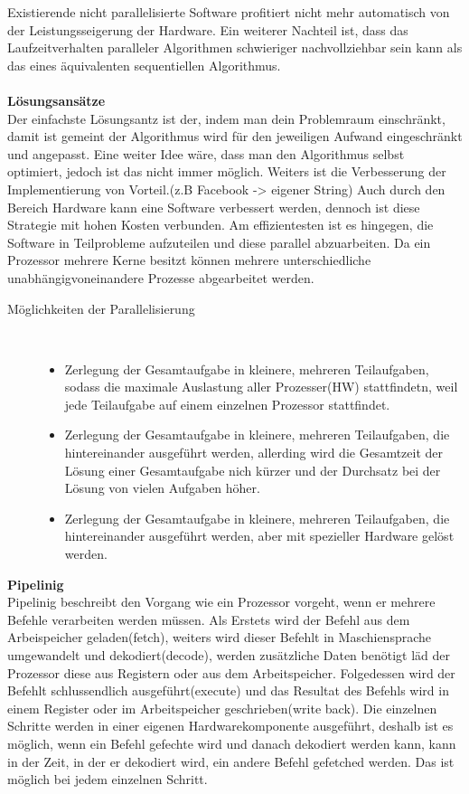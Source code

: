 \documentclass[a4paper,12pt]{article}
\begin{document}
Existierende nicht parallelisierte Software profitiert nicht mehr automatisch von der Leistungsseigerung der Hardware. Ein weiterer Nachteil ist, dass das Laufzeitverhalten paralleler Algorithmen schwieriger nachvollziehbar sein kann als das eines äquivalenten sequentiellen Algorithmus.\\\\
\textbf{Lösungsansätze\\}
Der einfachste Lösungsantz ist der, indem man dein Problemraum einschränkt, damit ist gemeint der Algorithmus wird für den jeweiligen Aufwand eingeschränkt und angepasst. Eine weiter Idee wäre, dass man den Algorithmus selbst optimiert, jedoch ist das nicht immer möglich. Weiters ist die Verbesserung der Implementierung von Vorteil.(z.B Facebook -> eigener String)
Auch durch den Bereich Hardware kann eine Software verbessert werden, dennoch ist diese Strategie mit hohen Kosten verbunden. Am effizientesten ist es hingegen, die Software in Teilprobleme aufzuteilen und diese parallel abzuarbeiten. Da ein Prozessor mehrere Kerne besitzt können mehrere unterschiedliche unabhängigvoneinandere Prozesse abgearbeitet werden. 
\begin{description}
    \item[Möglichkeiten der Parallelisierung] ~\par
    \begin{itemize}
        \item Zerlegung der Gesamtaufgabe in kleinere, mehreren Teilaufgaben, sodass die maximale Auslastung aller Prozesser(HW) stattfindetn, weil jede Teilaufgabe auf einem einzelnen Prozessor stattfindet.
        \item Zerlegung der Gesamtaufgabe in kleinere, mehreren Teilaufgaben, die hintereinander ausgeführt werden, allerding wird die Gesamtzeit der Lösung einer Gesamtaufgabe nich kürzer und der Durchsatz bei der Lösung von vielen Aufgaben höher.
        \item Zerlegung der Gesamtaufgabe in kleinere, mehreren Teilaufgaben, die hintereinander ausgeführt werden, aber mit spezieller Hardware gelöst werden.
    \end{itemize} 
\end{description}
\textbf{Pipelinig\\}
Pipelinig beschreibt den Vorgang wie ein Prozessor vorgeht, wenn er mehrere Befehle verarbeiten werden müssen. Als Erstets wird der Befehl aus dem Arbeispeicher geladen(fetch), weiters wird dieser Befehlt in Maschiensprache umgewandelt und dekodiert(decode), werden zusätzliche Daten benötigt läd der Prozessor diese aus Registern oder aus dem Arbeitspeicher. Folgedessen wird der Befehlt schlussendlich ausgeführt(execute) und das Resultat des Befehls wird in einem Register oder im Arbeitspeicher geschrieben(write back).
Die einzelnen Schritte werden in einer eigenen Hardwarekomponente ausgeführt, deshalb ist es möglich, wenn ein Befehl gefechte wird und danach dekodiert werden kann, kann in der Zeit, in der er dekodiert wird, ein andere Befehl gefetched werden. Das ist möglich bei jedem einzelnen Schritt.
\cite{parallelprogramming}
\end{document}
